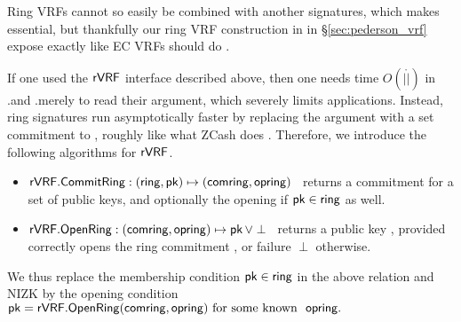 Ring VRFs cannot so easily be combined with another signatures, which
makes \aux essential,%
but thankfully our ring VRF construction in in \S\ref{sec:pederson_vrf} expose \aux exactly like EC VRFs should do .%


If one used the ${\mathsf{rVRF}}$ interface described above, then one needs time
$O(|\ring|)$ in \rVRF.\rSign and \rVRF.\rVerify merely to read their \ring
argument, which severely limits applications.
Instead, ring signatures run asymptotically faster by replacing the \ring
argument with a set commitment to \ring, roughly like what ZCash does \cite{zcash_protocol}. Therefore, we introduce the following algorithms for $ {\mathsf{rVRF}} $.
\begin{itemize}
\item ${\mathsf{rVRF}}.{\mathsf{CommitRing}} : (\mathsf{ring},\mathsf{pk}) \mapsto (\mathsf{comring},\mathsf{opring})$ \,
    returns a commitment for a set \ring of public keys, and
    optionally the opening \openring if $\mathsf{pk} \in \mathsf{ring}$ as well.
\item ${\mathsf{rVRF}}.{\mathsf{OpenRing}} : (\mathsf{comring},\mathsf{opring}) \mapsto \mathsf{pk} \, \lor \perp$ \,
    returns a public key \pk, provided \openring correctly opens
    the ring commitment \comring, or failure $\perp$ otherwise.
\end{itemize}

We thus replace the membership condition $\mathsf{pk} \in \mathsf{ring}$ in the above
relation and NIZK by the opening condition
$ \mathsf{pk} = {\mathsf{rVRF}}.{\mathsf{OpenRing}}(\mathsf{comring},\mathsf{opring}) \textrm{\ for some known \ } \mathsf{opring} . $
%

